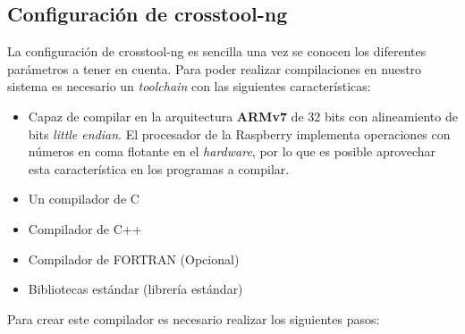 \documentclass{article}
\begin{document}
\subsection{Configuración de crosstool-ng}

La configuración de crosstool-ng es sencilla una vez se conocen los diferentes parámetros a tener en cuenta. Para poder realizar compilaciones en nuestro sistema es necesario un \textit{toolchain} con las siguientes características:

\begin{itemize}
	\item Capaz de compilar en la arquitectura \textbf{ARMv7} de 32 bits con alineamiento de bits \textit{little endian}. El procesador de la Raspberry implementa operaciones con números en coma flotante en el \textit{hardware}, por lo que es posible aprovechar esta característica en los programas a compilar.
	\item Un compilador de C
	\item Compilador de C++
	\item Compilador de FORTRAN (Opcional)
	\item Bibliotecas estándar (librería estándar)
\end{itemize}

Para crear este compilador es necesario realizar los siguientes pasos:
\end{document}
